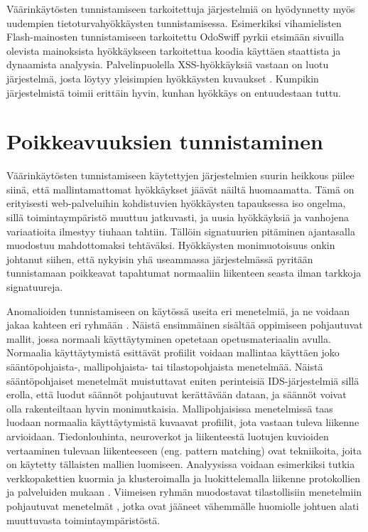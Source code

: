 Väärinkäytösten tunnistamiseen tarkoitettuja järjestelmiä on hyödynnetty myös uudempien tietoturvahyökkäysten tunnistamisessa. Esimerkiksi vihamielisten Flash-mainosten tunnistamiseen tarkoitettu 
OdoSwiff \cite{FlashAdd} pyrkii etsimään sivuilla olevista mainoksista hyökkäykseen tarkoitettua koodia käyttäen staattista ja dynaamista analyysia. Palvelinpuolella XSS-hyökkäyksiä vastaan on luotu 
järjestelmä, josta löytyy yleisimpien hyökkäysten kuvaukset \cite{SignatureXSS}. Kumpikin järjestelmistä toimii erittäin hyvin, kunhan hyökkäys on entuudestaan tuttu.

\section{Poikkeavuuksien tunnistaminen}

Väärinkäytösten tunnistamiseen käytettyjen järjestelmien suurin heikkous piilee siinä, että mallintamattomat hyökkäykset jäävät näiltä huomaamatta. Tämä on erityisesti web-palveluihin kohdistuvien
hyökkäysten tapauksessa iso ongelma, sillä toimintaympäristö muuttuu jatkuvasti, ja uusia hyökkäyksiä ja vanhojena variaatioita ilmestyy tiuhaan tahtiin. Tällöin signatuurien pitäminen ajantasalla
muodostuu mahdottomaksi tehtäväksi. Hyökkäysten monimuotoisuus onkin johtanut siihen, että nykyisin yhä useammassa järjestelmässä pyritään tunnistamaan poikkeavat tapahtumat normaaliin liikenteen seasta
ilman tarkkoja signatuureja. 

Anomalioiden tunnistamiseen on käytössä useita eri menetelmiä, ja ne voidaan jakaa kahteen eri ryhmään \cite{State}. Näistä ensimmäinen sisältää oppimiseen pohjautuvat mallit, jossa normaali 
käyttäytyminen opetetaan opetusmateriaalin avulla. Normaalia käyttäytymistä esittävät profiilit voidaan mallintaa käyttäen joko sään\-tö\-poh\-jais\-ta-, mallipohjaista- tai tilastopohjaista menetelmää. Näistä
sääntöpohjaiset menetelmät muistuttavat eniten perinteisiä IDS-järjestelmiä sillä erolla, että luodut säännöt pohjautuvat kerättävään dataan, ja säännöt voivat olla rakenteiltaan hyvin monimutkaisia. 
Mallipohjaisissa menetelmissä taas luodaan normaalia käyttäytymistä kuvaavat profiilit, jota vastaan tuleva liikenne arvioidaan. Tiedonlouhinta, neuroverkot ja liikenteestä luotujen kuvioiden vertaaminen
tulevaan liikenteeseen (eng. pattern matching) ovat tekniikoita, joita on käytetty tällaisten mallien luomiseen. Analyysissa voidaan esimerkiksi tutkia verkkopakettien kuormia \cite{Payload}\cite{ULISSE} 
ja klusteroimalla ja luokittelemalla liikenne protokollien ja palveluiden mukaan \cite{Cluster}. Viimeisen ryhmän muodostavat tilastollisiin menetelmiin pohjautuvat menetelmät \cite{PacketHeader}, jotka
ovat jääneet vähemmälle huomiolle johtuen alati muuttuvasta toimintaympäristöstä.

